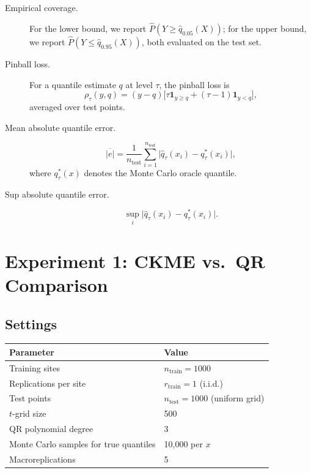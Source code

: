 \documentclass[11pt]{article}
\begin{document}
	\begin{description}
		\item[Empirical coverage.] For the lower bound, we report
		$\hat{P}(Y \ge \hat{q}_{0.05}(X))$; for the upper bound, we report
		$\hat{P}(Y \le \hat{q}_{0.95}(X))$, both evaluated on the test set.
		\item[Pinball loss.] For a quantile estimate $q$ at level $\tau$, the pinball loss is
		\[
		\rho_\tau(y, q)
		= (y-q)\bigl[\tau \mathbf{1}_{y \ge q} + (\tau-1)\mathbf{1}_{y<q}\bigr],
		\]
		averaged over test points.
		\item[Mean absolute quantile error.]
		\[
		\overline{|e|}
		= \frac{1}{n_{\mathrm{test}}}
		\sum_{i=1}^{n_{\mathrm{test}}}
		\bigl|\hat{q}_\tau(x_i) - q_\tau^*(x_i)\bigr|,
		\]
		where $q_\tau^*(x)$ denotes the Monte Carlo oracle quantile.
		\item[Sup absolute quantile error.]
		\[
		\sup_i \bigl|\hat{q}_\tau(x_i)-q_\tau^*(x_i)\bigr|.
		\]
	\end{description}
	
	\section{Experiment 1: CKME vs.\ QR Comparison}
	
	\subsection{Settings}
	
	\begin{center}
		\begin{tabular}{ll}
			\toprule
			Parameter & Value \\
			\midrule
			Training sites & $n_{\mathrm{train}} = 1000$ \\
			Replications per site & $r_{\mathrm{train}} = 1$ (i.i.d.) \\
			Test points & $n_{\mathrm{test}} = 1000$ (uniform grid) \\
			$t$-grid size & 500 \\
			QR polynomial degree & 3 \\
			Monte Carlo samples for true quantiles & 10{,}000 per $x$ \\
			Macroreplications & 5 \\
			\bottomrule
		\end{tabular}
	\end{center}
	
\end{document}
